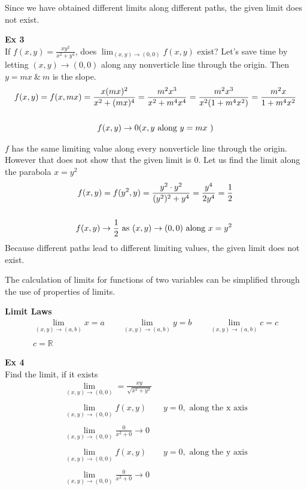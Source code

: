 \documentclass{article}
\begin{document}
 Since we have obtained different limits along different paths, the given limit does not exist.

 \textbf{Ex 3}\\
 If $ f(x,y)=\frac{xy^{2}}{x^{2}+y^{4}} $, does $ \lim_{(x,y) \to (0,0)}f(x,y) $ exist?
 Let's save time by letting $ (x,y)\to(0,0) $ along any nonverticle line through the origin. Then $ y=mx ~\&~ m$  is the slope.
 \[
   \begin{gathered}
     f(x,y)=f(x,mx)=\frac{x(mx)^{2}}{x^{2}+(mx)^{4}}=\frac{m^{2}x^{3}}{x^{2}+m^{4}x^{4}}=\frac{m^{2}x^{3}}{x^{2}(1+m^{4}x^{2})}=\frac{m^{2}x}{1+m^{4}x^{2}}\\
     ~\\
     f(x,y)\to 0 \text{($ x,y $ along $ y=mx $ )}
   \end{gathered}
 \]

 $ f $ has the same limiting value along every nonverticle line through the origin. However that does not show that the given limit is $ 0 $. Let us find the limit along the parabola $ x=y^{2}$
 \[
   \begin{gathered}
     f(x,y)=f(y^{2},y)=\frac{y^{2} \cdot y^{2}  }{(y^{2})^{2} +y^{4} }=\frac{y^{4}}{2y^{4}}=\frac{1}{2}\\
     ~\\
     f(x,y)\to \frac{1}{2} \text{ as $ (x,y)\to (0,0) $ along $ x=y^{2} $ } 
   \end{gathered}
 \]
 Because different paths lead to different limiting values, the given limit does not exist.

 The calculation of limits for functions of two variables can be simplified through the use of properties of limits.

 \textbf{Limit Laws}
 \[
   \begin{gathered}
   \lim_{(x,y) \to (a,b)} x=a \qquad \lim_{(x,y) \to (a,b)} y=b \qquad \lim_{(x,y) \to (a,b)} c=c\\
   ~\\
   c=\mathbb{R}
   \end{gathered}
 \]

 \textbf{Ex 4}\\
 Find the limit, if it exists
 \[
   \begin{gathered}
   \lim_{(x,y) \to (0,0)} = \frac{xy}{\sqrt{x^{2}+y^{2}}}\\
   ~\\
   \lim_{(x,y) \to (0,0)}f(x,y) \qquad y=0,\text{ along the x axis}\\
   ~\\
   \lim_{(x,y) \to (0,0)}\frac{0}{x^{2}+0 } \to 0\\
   ~\\
   \lim_{(x,y) \to (0,0)}f(x,y) \qquad y=0,\text{ along the y axis}\\
   ~\\
   \lim_{(x,y) \to (0,0)}\frac{0}{x^{2}+0 } \to 0
   \end{gathered}
 \]
\end{document}
